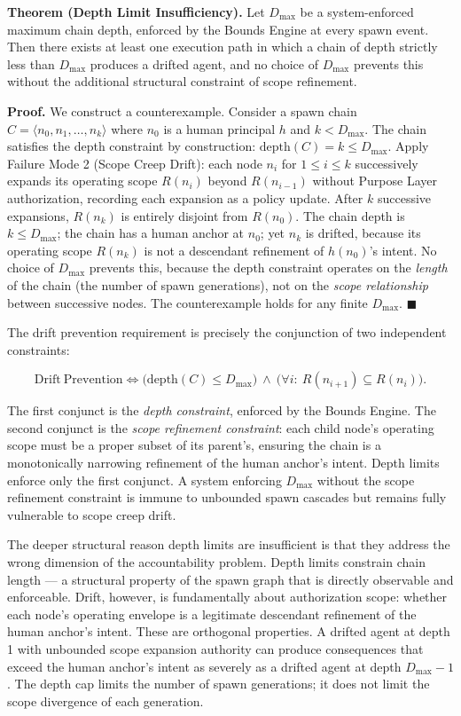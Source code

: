 \medskip
\noindent\textbf{Theorem (Depth Limit Insufficiency).}
Let $D_{\max}$ be a system-enforced maximum chain depth, enforced by the Bounds Engine at every spawn event. Then there exists at least one execution path in which a chain of depth strictly less than $D_{\max}$ produces a drifted agent, and no choice of $D_{\max}$ prevents this without the additional structural constraint of scope refinement.

\medskip
\noindent\textbf{Proof.} We construct a counterexample. Consider a spawn chain $C = \langle n_0, n_1, \ldots, n_k \rangle$ where $n_0$ is a human principal $h$ and $k < D_{\max}$. The chain satisfies the depth constraint by construction: $\mathrm{depth}(C) = k \leq D_{\max}$. Apply Failure Mode 2 (Scope Creep Drift): each node $n_i$ for $1 \leq i \leq k$ successively expands its operating scope $R(n_i)$ beyond $R(n_{i-1})$ without Purpose Layer authorization, recording each expansion as a policy update. After $k$ successive expansions, $R(n_k)$ is entirely disjoint from $R(n_0)$. The chain depth is $k \leq D_{\max}$; the chain has a human anchor at $n_0$; yet $n_k$ is drifted, because its operating scope $R(n_k)$ is not a descendant refinement of $h(n_0)$'s intent. No choice of $D_{\max}$ prevents this, because the depth constraint operates on the \emph{length} of the chain (the number of spawn generations), not on the \emph{scope relationship} between successive nodes. The counterexample holds for any finite $D_{\max}$. $\blacksquare$

The drift prevention requirement is precisely the conjunction of two independent constraints:

\begin{equation}
\mathrm{Drift\ Prevention} \iff \bigl( \mathrm{depth}(C) \leq D_{\max} \bigr)\ \land\ \bigl( \forall i:\ R(n_{i+1}) \subseteq R(n_i) \bigr).
\label{eq:rs-drift-prevention-constraint}
\end{equation}

The first conjunct is the \emph{depth constraint}, enforced by the Bounds Engine. The second conjunct is the \emph{scope refinement constraint}: each child node's operating scope must be a proper subset of its parent's, ensuring the chain is a monotonically narrowing refinement of the human anchor's intent. Depth limits enforce only the first conjunct. A system enforcing $D_{\max}$ without the scope refinement constraint is immune to unbounded spawn cascades but remains fully vulnerable to scope creep drift.

The deeper structural reason depth limits are insufficient is that they address the wrong dimension of the accountability problem. Depth limits constrain chain length — a structural property of the spawn graph that is directly observable and enforceable. Drift, however, is fundamentally about authorization scope: whether each node's operating envelope is a legitimate descendant refinement of the human anchor's intent. These are orthogonal properties. A drifted agent at depth 1 with unbounded scope expansion authority can produce consequences that exceed the human anchor's intent as severely as a drifted agent at depth $D_{\max} - 1$. The depth cap limits the number of spawn generations; it does not limit the scope divergence of each generation.


